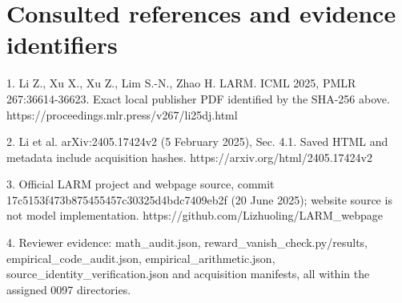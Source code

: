 \documentclass[10pt]{article}
\begin{document}
\section*{Consulted references and evidence identifiers}
1. Li Z., Xu X., Xu Z., Lim S.-N., Zhao H. LARM. ICML 2025, PMLR 267:36614-36623. Exact local publisher PDF identified by the SHA-256 above. https://proceedings.mlr.press/v267/li25dj.html\par
2. Li et al. arXiv:2405.17424v2 (5 February 2025), Sec. 4.1. Saved HTML and metadata include acquisition hashes. https://arxiv.org/html/2405.17424v2\par
3. Official LARM project and webpage source, commit 17c5153f473b875455457c30325d4bdc7409eb2f (20 June 2025); website source is not model implementation. https://github.com/Lizhuoling/LARM\_webpage\par
4. Reviewer evidence: math\_audit.json, reward\_vanish\_check.py/results, empirical\_code\_audit.json, empirical\_arithmetic.json, source\_identity\_verification.json and acquisition manifests, all within the assigned 0097 directories.\par
\end{document}
